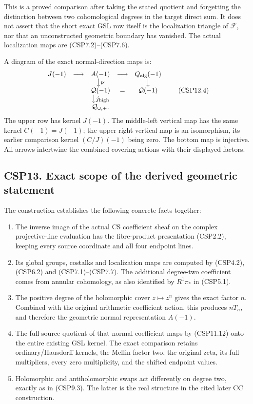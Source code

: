 This is a proved comparison after taking the stated quotient and
forgetting the distinction between two cohomological degrees in the
target direct sum. It does not assert that the short exact GSL row
itself is the localization triangle of \(\mathscr F\), nor that an
unconstructed geometric boundary has vanished. The actual localization
maps are (CSP7.2)--(CSP7.6).

A diagram of the exact normal-direction maps is: \[
\begin{array}{ccccc}
J(-1)&\longrightarrow&A(-1)&\longrightarrow&Q_{\rm alg}(-1)\\
&&\big\downarrow{\nu}&&\big\downarrow\\
&&\mathcal Q(-1)&=&\mathcal Q(-1)\\
&&\big\downarrow{j_{\rm high}}\\
&&\mathcal Q_{\cup,+}.
\end{array}
\tag{CSP12.4}
\] The upper row has kernel \(J(-1)\). The middle-left vertical map has
the same kernel \(C(-1)=J(-1)\); the upper-right vertical map is an
isomorphism, its earlier comparison kernel \((C/J)(-1)\) being zero. The
bottom map is injective. All arrows intertwine the combined covering
actions with their displayed factors.

\subsection{CSP13. Exact scope of the derived geometric
statement}\label{csp13.-exact-scope-of-the-derived-geometric-statement}

The construction establishes the following concrete facts together:

\begin{enumerate}
\def\labelenumi{\arabic{enumi}.}
\tightlist
\item
  The inverse image of the actual CS coefficient sheaf on the complex
  projective-line evaluation has the fibre-product presentation
  (CSP2.2), keeping every source coordinate and all four endpoint lines.
\item
  Its global groups, costalks and localization maps are computed by
  (CSP4.2), (CSP6.2) and (CSP7.1)--(CSP7.7). The additional degree-two
  coefficient comes from annular cohomology, as also identified by
  \(R^1\pi_*\) in (CSP5.1).
\item
  The positive degree of the holomorphic cover \(z\mapsto z^n\) gives
  the exact factor \(n\). Combined with the original arithmetic
  coefficient action, this produces \(nT_n\), and therefore the
  geometric normal representation \(A(-1)\).
\item
  The full-source quotient of that normal coefficient maps by (CSP11.12)
  onto the entire existing GSL kernel. The exact comparison retains
  ordinary/Hausdorff kernels, the Mellin factor two, the original zeta,
  its full multipliers, every zero multiplicity, and the shifted
  endpoint values.
\item
  Holomorphic and antiholomorphic swaps act differently on degree two,
  exactly as in (CSP9.3). The latter is the real structure in the cited
  later CC construction.
\end{enumerate}

